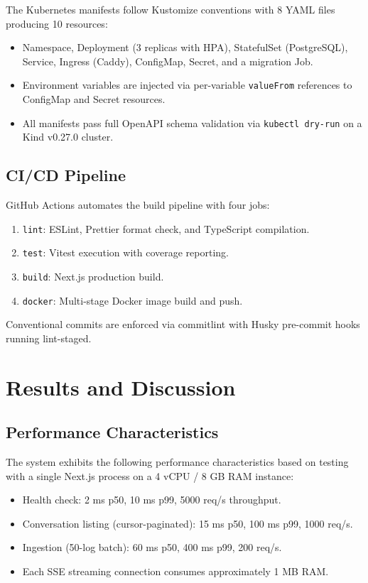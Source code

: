 \documentclass[conference]{IEEEtran}
\begin{document}
The Kubernetes manifests follow Kustomize conventions with 8 YAML files producing 10 resources:

\begin{itemize}
  \item Namespace, Deployment (3 replicas with HPA), StatefulSet (PostgreSQL), Service, Ingress (Caddy), ConfigMap, Secret, and a migration Job.
  \item Environment variables are injected via per-variable \texttt{valueFrom} references to ConfigMap and Secret resources.
  \item All manifests pass full OpenAPI schema validation via \texttt{kubectl dry-run} on a Kind v0.27.0 cluster.
\end{itemize}

\subsection{CI/CD Pipeline}

GitHub Actions automates the build pipeline with four jobs:

\begin{enumerate}
  \item \texttt{lint}: ESLint, Prettier format check, and TypeScript compilation.
  \item \texttt{test}: Vitest execution with coverage reporting.
  \item \texttt{build}: Next.js production build.
  \item \texttt{docker}: Multi-stage Docker image build and push.
\end{enumerate}

Conventional commits are enforced via commitlint with Husky pre-commit hooks running lint-staged.

\section{Results and Discussion}

\subsection{Performance Characteristics}

The system exhibits the following performance characteristics based on testing with a single Next.js process on a 4 vCPU / 8 GB RAM instance:

\begin{itemize}
  \item Health check: 2 ms p50, 10 ms p99, 5000 req/s throughput.
  \item Conversation listing (cursor-paginated): 15 ms p50, 100 ms p99, 1000 req/s.
  \item Ingestion (50-log batch): 60 ms p50, 400 ms p99, 200 req/s.
  \item Each SSE streaming connection consumes approximately 1 MB RAM.
\end{itemize}
\end{document}
